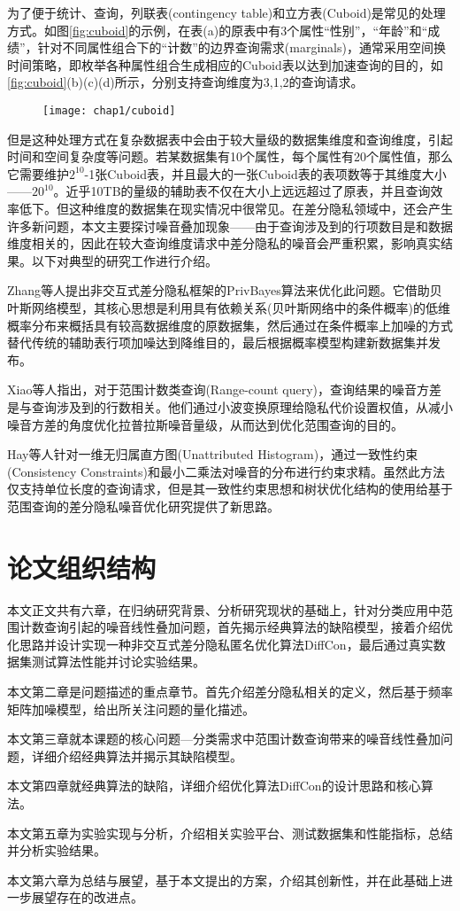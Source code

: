 为了便于统计、查询，列联表(contingency table)和立方表(Cuboid)是常见的处理方式。如图\ref{fig:cuboid}的示例，在表(a)的原表中有3个属性“性别”，“年龄”和“成绩”，针对不同属性组合下的“计数”的边界查询需求(marginals\cite{marginals})，通常采用空间换时间策略，即枚举各种属性组合生成相应的Cuboid表以达到加速查询的目的，如\ref{fig:cuboid}(b)(c)(d)所示，分别支持查询维度为3,1,2的查询请求。

\begin{figure}[!htp]
	\centering
	\texttt{[image: chap1/cuboid]}
\end{figure}

但是这种处理方式在复杂数据表中会由于较大量级的数据集维度和查询维度，引起时间和空间复杂度等问题。若某数据集有10个属性，每个属性有20个属性值，那么它需要维护$2^{10}$-1张Cuboid表，并且最大的一张Cuboid表的表项数等于其维度大小——$20^{10}$。近乎10TB的量级的辅助表不仅在大小上远远超过了原表，并且查询效率低下。但这种维度的数据集在现实情况中很常见。在差分隐私领域中，还会产生许多新问题，本文主要探讨噪音叠加现象——由于查询涉及到的行项数目是和数据维度相关的，因此在较大查询维度请求中差分隐私的噪音会严重积累，影响真实结果。以下对典型的研究工作进行介绍。

Zhang\cite{privbayes}等人提出非交互式差分隐私框架的PrivBayes算法来优化此问题。它借助贝叶斯网络模型，其核心思想是利用具有依赖关系(贝叶斯网络中的条件概率)的低维概率分布来概括具有较高数据维度的原数据集，然后通过在条件概率上加噪的方式替代传统的辅助表行项加噪达到降维目的，最后根据概率模型构建新数据集并发布。

Xiao\cite{wavelet}等人指出，对于范围计数类查询(Range-count query)，查询结果的噪音方差是与查询涉及到的行数相关。他们通过小波变换原理给隐私代价设置权值，从减小噪音方差的角度优化拉普拉斯噪音量级，从而达到优化范围查询的目的。

Hay\cite{boosting}等人针对一维无归属直方图(Unattributed Histogram)，通过一致性约束(Consistency Constraints)和最小二乘法对噪音的分布进行约束求精。虽然此方法仅支持单位长度的查询请求，但是其一致性约束思想和树状优化结构的使用给基于范围查询的差分隐私噪音优化研究提供了新思路。

\section{论文组织结构}

本文正文共有六章，在归纳研究背景、分析研究现状的基础上，针对分类应用中范围计数查询引起的噪音线性叠加问题，首先揭示经典算法的缺陷模型，接着介绍优化思路并设计实现一种非交互式差分隐私匿名优化算法DiffCon，最后通过真实数据集测试算法性能并讨论实验结果。

本文第二章是问题描述的重点章节。首先介绍差分隐私相关的定义，然后基于频率矩阵加噪模型，给出所关注问题的量化描述。

本文第三章就本课题的核心问题---分类需求中范围计数查询带来的噪音线性叠加问题，详细介绍经典算法并揭示其缺陷模型。

本文第四章就经典算法的缺陷，详细介绍优化算法DiffCon的设计思路和核心算法。

本文第五章为实验实现与分析，介绍相关实验平台、测试数据集和性能指标，总结并分析实验结果。

本文第六章为总结与展望，基于本文提出的方案，介绍其创新性，并在此基础上进一步展望存在的改进点。